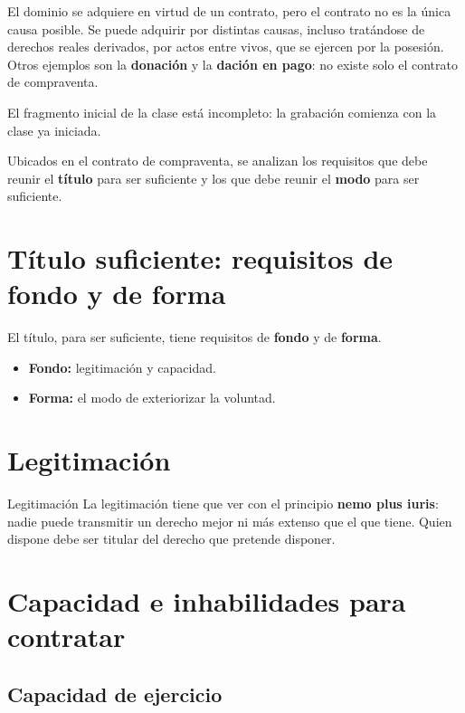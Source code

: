 \documentclass[12pt,oneside]{book}
\begin{document}
El dominio se adquiere en virtud de un contrato, pero el contrato no es la única causa posible. Se puede adquirir por distintas causas, incluso tratándose de derechos reales derivados, por actos entre vivos, que se ejercen por la posesión. Otros ejemplos son la \textbf{donación} y la \textbf{dación en pago}: no existe solo el contrato de compraventa.

\begin{note}
El fragmento inicial de la clase está incompleto: la grabación comienza con la clase ya iniciada.
\end{note}

Ubicados en el contrato de compraventa, se analizan los requisitos que debe reunir el \textbf{título} para ser suficiente y los que debe reunir el \textbf{modo} para ser suficiente.

\section{Título suficiente: requisitos de fondo y de forma}

El título, para ser suficiente, tiene requisitos de \textbf{fondo} y de \textbf{forma}.

\begin{itemize}
    \item \textbf{Fondo:} legitimación y capacidad.
    \item \textbf{Forma:} el modo de exteriorizar la voluntad.
\end{itemize}

\section{Legitimación}

\begin{definition}{Legitimación}
La legitimación tiene que ver con el principio \textbf{nemo plus iuris}: nadie puede transmitir un derecho mejor ni más extenso que el que tiene. Quien dispone debe ser titular del derecho que pretende disponer.
\end{definition}

\section{Capacidad e inhabilidades para contratar}

\subsection{Capacidad de ejercicio}
\end{document}
